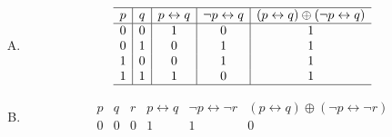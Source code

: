 {{\begin{practices}
\begin{enumerate}[A.]
{\begin{table}[H]
\[\begin{array}{c|c|c|c|c}
                                \hline
                                p & q & p \vee q & p \wedge q & (p \vee q) \oplus (p \wedge q) \\
                                \hline
                                0 & 0 & 0 & 0 & 0 \\
                                0 & 1 & 1 & 0 & 1 \\
                                1 & 0 & 1 & 0 & 1 \\
                                1 & 1 & 1 & 1 & 0 \\
                                \hline
                            \end{array}
                        \]
                    \end{table}
                }
                \item
                {
                    \begin{table}[H]
                        \[
                            \begin{array}{c|c|c|c|c}
                                \hline
                                p & q & p \leftrightarrow q & \neg p \leftrightarrow q & (p \leftrightarrow q) \oplus (\neg p \leftrightarrow q) \\
                                \hline
                                0 & 0 & 1 & 0 & 1 \\
                                0 & 1 & 0 & 1 & 1 \\
                                1 & 0 & 0 & 1 & 1 \\
                                1 & 1 & 1 & 0 & 1 \\
                                \hline
                            \end{array}
                        \]
                    \end{table}
                }
                \item
                {
                    \begin{table}[H]
                        \[
                            \begin{array}{c|c|c|c|c|c}
                                \hline
                                p & q & r & p \leftrightarrow q & \neg p \leftrightarrow \neg r & (p \leftrightarrow q) \oplus (\neg p \leftrightarrow \neg r) \\
                                \hline
                                0 & 0 & 0 & 1 & 1 & 0 \\

\end{array}\]
\end{table}}
\end{enumerate}
\end{practices}}}
